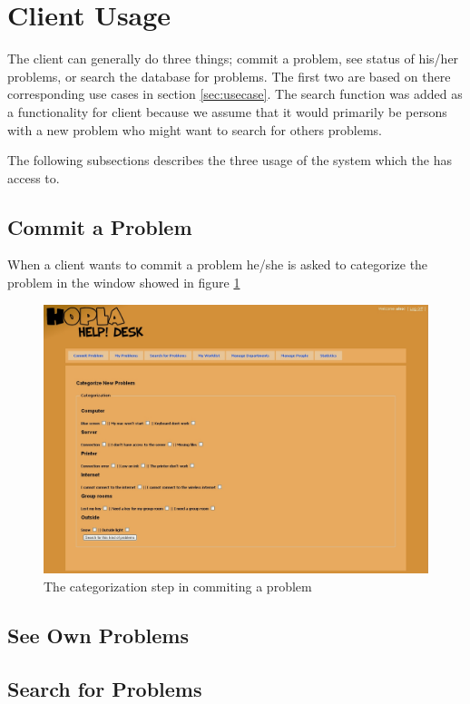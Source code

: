 \section{Client Usage}
\label{sec:client_usage}
The client can generally do three things; commit a problem, see status of his/her problems, or search the database for problems.
The first two are based on there corresponding use cases in section \ref{sec:usecase}.
The search function was added as a functionality for client because we assume that it would primarily be persons with a new problem who might want to search for others problems.

The following subsections describes the three usage of the system which the \aclient[] has access to.

\subsection{Commit a Problem}
When a client wants to commit a problem he/she is asked to categorize the problem in the window showed in figure \ref{fig:commit}

\begin{figure}
	\centering
		\includegraphics[width=1.00\textwidth, clip=true, trim=2.9cm 0.5cm 3cm 8cm]{input/implementation/program_presentation/commit.png}
	\caption{The categorization step in commiting a problem}
	\label{fig:commit}
\end{figure}


\subsection{See Own Problems}


\subsection{Search for Problems}
